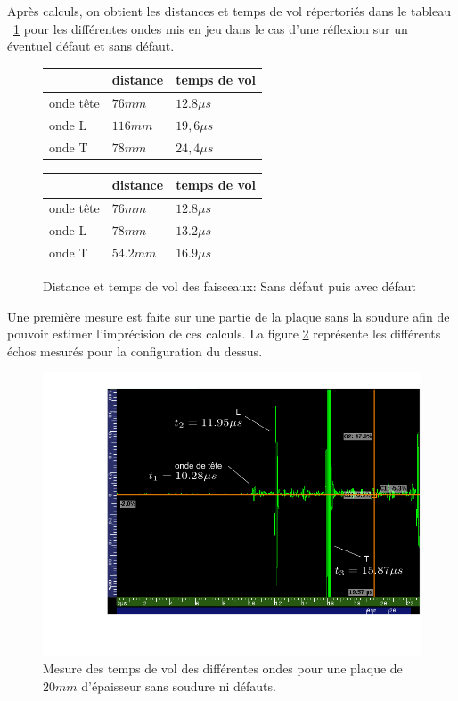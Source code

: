 \documentclass[twoside]{article}
\begin{document}
\begin{multicols}{2}
Après calculs, on obtient les distances et temps de vol répertoriés dans le tableau ~\ref{tab2} pour les différentes ondes mis en jeu dans le cas d'une réflexion sur un éventuel défaut et sans défaut.
\bigskip


\begin{figure}[H]
\begin{tabular}{l|l|l}
~ & distance & temps de vol \\ \hline
onde tête &$76 mm $& $ 12.8 \mu s$ \\
onde L &$ 116 mm $&$ 19,6 \mu s $\\
onde T &$ 78 mm $&$ 24,4 \mu s$ \\ \hline \hline
\end{tabular}

\begin{tabular}{l|l|l}
~ & distance & temps de vol \\ \hline
onde tête &$76 mm $& $ 12.8 \mu s$ \\
onde L &$ 78 mm $&$ 13.2 \mu s $\\
onde T &$ 54.2 mm $&$ 16.9 \mu s$
\end{tabular}

\caption{\label{tab2} Distance et temps de vol des faisceaux: Sans défaut puis avec défaut}
\end{figure}

Une première mesure est faite sur une partie de la plaque sans la soudure afin de pouvoir estimer l’imprécision de ces calculs. La figure \ref{fig1} représente les différents échos mesurés pour la configuration du dessus.

\begin{figure}[H]
\centering
\includegraphics[scale=0.4]{./images/mesure_SD1.png}
\caption{\label{fig1} Mesure des temps de vol des différentes ondes pour une plaque de $20 mm$ d'épaisseur sans soudure ni défauts.}
\end{figure}


\end{multicols}
\end{document}
